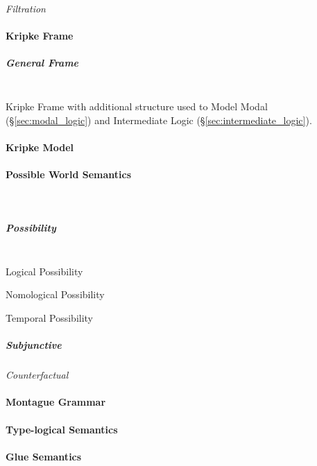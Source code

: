 \emph{Filtration}



\paragraph{Kripke Frame}\label{sec:kripke_frame}

\subparagraph{General Frame}\label{sec:general_frame}
\hfill \\

Kripke Frame with additional structure used to Model Modal
(\S\ref{sec:modal_logic}) and Intermediate Logic
(\S\ref{sec:intermediate_logic}).



\paragraph{Kripke Model}\label{sec:kripke_model}

\paragraph{Possible World Semantics}\label{sec:possible_world}
\hfill \\

\subparagraph{Possibility}\label{sec:possibility}
\hfill \\

Logical Possibility

Nomological Possibility

Temporal Possibility

\subparagraph{Subjunctive}\label{sec:subjunctive}

\emph{Counterfactual}



\paragraph{Montague Grammar}\label{sec:montague_grammar}

\paragraph{Type-logical Semantics}\label{sec:typelogical_semantics}

\paragraph{Glue Semantics}\label{sec:glue_semantics}



